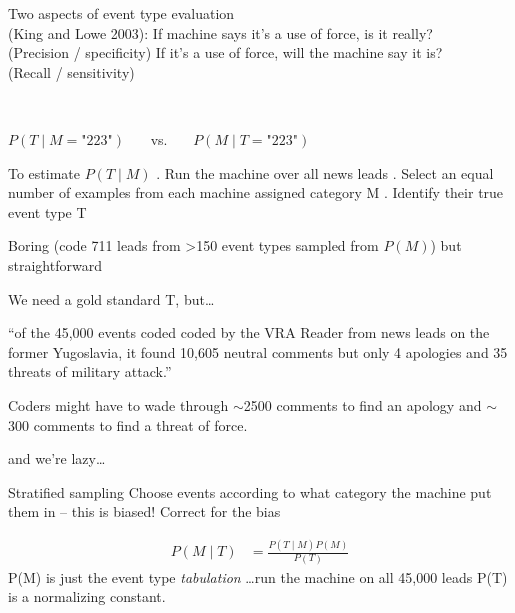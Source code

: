 \documentclass{mediumfoils}
\newcommand{\mkgrey}[1]{#1}
\begin{document}

Two aspects of event type evaluation\\ \mkgrey{(King and Lowe 2003)}:
\ita
\itm If machine says it's a use of force, is it really?\\
{(Precision / specificity)}
\itm If it's a use of force, will the machine say it is? \\
{(Recall / sensitivity)} 
\itz

~\\
{\large
\centerline{$P(T \mid M=\text{"223"})$ ~~~vs.~~~ $P(M \mid T=\text{"223"})$}
}


To estimate $P(T \mid M)$
\ita
{}. Run the machine over all news leads 
. Select an equal number of examples from each machine assigned category M
. Identify their true event type T
\itz

Boring (code 711 leads from >150 event types sampled from $P(M)$) but straightforward



We need a gold standard T, but\ldots

\textrm{``of the 45,000 events coded coded by
the VRA Reader from news leads on the former Yugoslavia, it found
10,605 neutral comments but only 4 apologies and 35 threats of
military attack.''}

\vfill
Coders might have to wade through $\sim$2500 comments to find an apology and $\sim$ 300 comments to find a threat of force.

and we're lazy\ldots


Stratified sampling
\ita
\itm Choose events according to what category the machine put them in
\itm -- this is biased!
\itm Correct for the bias
\itz 

{\large
\begin{align*}
 P(M\mid T)   & = \frac{P(T\mid M)P(M)}{P(T)}
\end{align*}
}
\pause
P(M) is just the event type \textit{tabulation}
\ita
\itm \ldots run the machine on all 45,000 leads
\itz \pause
P(T) is a normalizing constant.


%
%
\end{document}
